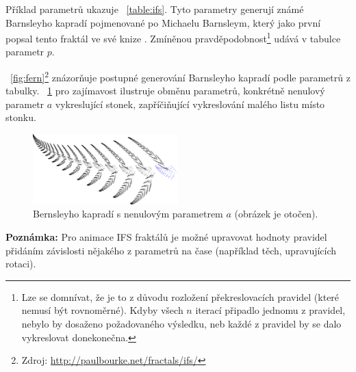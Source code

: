 \documentclass[thesis=B, czech]{FITthesis}[2019/03/06]
\newcommand{\note}[1]{\begin{noteBox} \textbf{Poznámka:} #1 \end{noteBox}}
\begin{document}
 Příklad parametrů ukazuje \tablename~\ref{table:ifs}. Tyto parametry generují známé Barnsleyho kapradí pojmenované po Michaelu Barnsleym, který jako první popsal tento fraktál ve své knize \cite{barnsley}. Zmíněnou pravděpodobnost\footnote{Lze se domnívat, že je to z důvodu rozložení překreslovacích pravidel (které nemusí být rovnoměrné). Kdyby všech $n$ iterací připadlo jednomu z pravidel, nebylo by dosaženo požadovaného výsledku, neb každé z pravidel by se dalo vykreslovat donekonečna.} udává v tabulce parametr $p$.
 
 \figurename~\ref{fig:fern}\footnote{Zdroj: \url{http://paulbourke.net/fractals/ifs/}} znázorňuje postupné generování Barnsleyho kapradí podle parametrů z tabulky.  \figurename~\ref{fig:fernStem} pro zajímavost ilustruje obměnu parametrů, konkrétně nenulový parametr $a$ vykreslující stonek, zapříčiňující vykreslování malého listu místo stonku.

\begin{figure}[h]
\centering
    \includegraphics[width=0.5\textwidth]{images/fernA.png}
      \caption[Bernsleyho kapradí s nenulovým parametrem $a$.]{ \label{fig:fernStem}Bernsleyho kapradí s nenulovým parametrem $a$ (obrázek je otočen).}
\end{figure}





\hspace{5cm}



\note{Pro animace IFS fraktálů je možné upravovat hodnoty pravidel přidáním závislosti nějakého z parametrů na čase (například těch, upravujících rotaci).}
    
\end{document}
